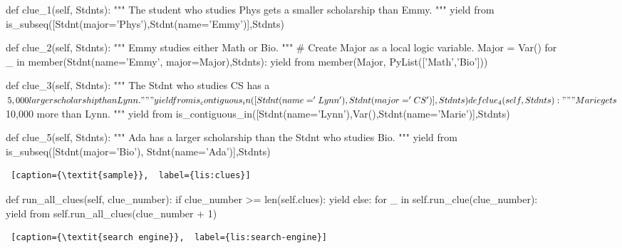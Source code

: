 \begin{figure*}[htb]
\flushright
\begin{minipage}[c]{0.95\textwidth}
\begin{python1}
def clue_1(self, Stdnts):
  """ The student who studies Phys gets a smaller scholarship than Emmy. """
  yield from is_subseq([Stdnt(major='Phys'),Stdnt(name='Emmy')],Stdnts)

def clue_2(self, Stdnts):
  """ Emmy studies either Math or Bio. """
  # Create Major as a local logic variable.
  Major = Var()
  for _ in member(Stdnt(name='Emmy', major=Major),Stdnts):
    yield from member(Major, PyList(['Math','Bio'])) 

def clue_3(self, Stdnts):
  """ The Stdnt who studies CS has a $5,000 larger scholarship than Lynn. """
  yield from is_contiguous_in([Stdnt(name='Lynn'), Stdnt(major='CS')], Stdnts)
  
def clue_4(self, Stdnts):
  """ Marie gets $10,000 more than Lynn. """
  yield from is_contiguous_in([Stdnt(name='Lynn'),Var(),Stdnt(name='Marie')],Stdnts)
  
def clue_5(self, Stdnts):
  """ Ada has a larger scholarship than the Stdnt who studies Bio. """
  yield from is_subseq([Stdnt(major='Bio'), Stdnt(name='Ada')],Stdnts)
\end{python1}\linv
\begin{lstlisting} [caption={\textit{sample}},  label={lis:clues}]
\end{lstlisting}
\end{minipage} \linv
\end{figure*}

\begin{center}
\begin{figure}[!t]
\flushright
\begin{minipage}[c]{0.46\textwidth}
\begin{python1}
def run_all_clues(self, clue_number):
  if clue_number >= len(self.clues): yield
  else:
    for _ in self.run_clue(clue_number):
      yield from self.run_all_clues(clue_number + 1)
\end{python1}\linv
\begin{lstlisting} [caption={\textit{search engine}},  label={lis:search-engine}]
\end{lstlisting}
\end{minipage}  \linv 
\end{figure}
\end{center}

